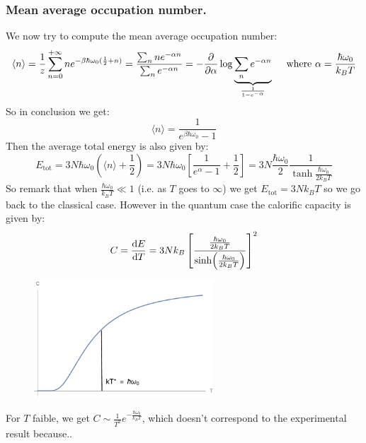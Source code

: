 \documentclass[10pt,a4paper]{book}
\begin{document}
\subsubsection{Mean average occupation number.}
We now try to compute the mean average occupation number:
\[
\langle n \rangle = \frac{1}{z} \sum_{n = 0}^{+\infty} n e^{-\beta \hbar \omega_0 (\frac{1}{2} + n)} = \frac{\sum_n n e^{-\alpha n}}{\sum_n e^{-\alpha n}} = -\pdv{}{\alpha} \log\underbrace{\sum_{n} e^{-\alpha n}}_{\frac{1}{1 - e^{-\alpha}}} \quad \text{ where } \alpha = \frac{\hbar \omega_0}{k_B T}
\]
So in conclusion we get:
\[
\langle n \rangle = \frac{1}{e^{\beta \hbar \omega_0} - 1}
\]
Then the average total energy is also given by:
\[
E_\text{tot} = 3N \hbar \omega_0 (\langle n \rangle + \frac{1}{2}) = 3N \hbar \omega_0 \left[ \frac{1}{e^{\alpha} - 1} + \frac{1}{2} \right ] = 3N \frac{\hbar \omega_0}{2} \frac{1}{\tanh \frac{\hbar \omega_0}{2k_B T}}
\]
So remark that when $\frac{\hbar \omega_0}{k_B T} \ll 1$ (i.e. as $T$ goes to $\infty$) we get $E_\text{tot} = 3N k_B T$ so we go back to the classical case. However in the quantum case the calorific capacity is given by:
\[
C = \dv{E}{T} = 3 N k_B \left[ \frac{\frac{\hbar \omega_0}{2k_B T}}{\sinh(\frac{\hbar \omega_0}{2 k_B T})} \right]^2
\]
\begin{figure}[h!]
\centering
\includegraphics[width = 0.6\textwidth]{graphs/quantum_cc}
\end{figure}

For $T$ faible, we get $C\sim\frac{1}{T^2}e^{-\frac{\hbar\omega_0}{k_BT}}$, which doesn't correspond to the experimental result because..
\end{document}
